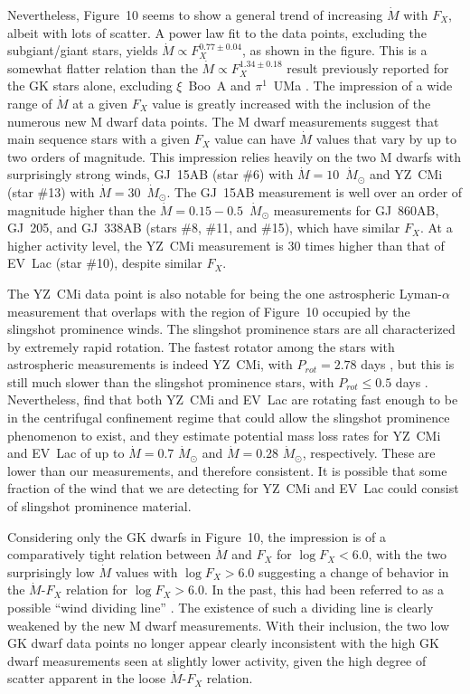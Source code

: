 \documentclass[preprint]{aastex}
\begin{document}
     Nevertheless, Figure~10 seems to show a general trend of increasing
$\dot{M}$ with $F_X$, albeit with lots of scatter.  A power law fit to the
data points, excluding the subgiant/giant stars, yields
$\dot{M}\propto F_X^{0.77\pm 0.04}$, as shown in the figure.  This
is a somewhat flatter relation than the $\dot{M}\propto F_X^{1.34\pm 0.18}$
result previously reported for the GK stars alone, excluding $\xi$~Boo~A and
$\pi^1$~UMa \citep{bew05a}.  The impression of
a wide range of $\dot{M}$ at a given $F_X$ value is greatly increased
with the inclusion of the numerous new M dwarf data points.
The M dwarf measurements suggest that main sequence stars with a
given $F_X$ value can have $\dot{M}$ values that vary by up to two
orders of magnitude.  This impression relies heavily on the two M
dwarfs with surprisingly strong winds, GJ~15AB (star \#6) with
$\dot{M}=10$~$\dot{M}_{\odot}$ and YZ~CMi (star \#13) with
$\dot{M}=30$~$\dot{M}_{\odot}$.  The GJ~15AB measurement is well over
an order of magnitude higher than the $\dot{M}=0.15-0.5$~$\dot{M}_{\odot}$ 
measurements for GJ~860AB, GJ~205, and GJ~338AB (stars \#8, \#11, and \#15),
which have similar $F_X$.  At a higher activity level, the YZ~CMi
measurement is 30 times higher than that of EV~Lac (star \#10),
despite similar $F_X$.

     The YZ~CMi data point is also notable for being the one astrospheric
Lyman-$\alpha$ measurement that overlaps with the region of Figure~10
occupied by the slingshot prominence winds.  The slingshot prominence
stars are all characterized by extremely rapid rotation.  The fastest
rotator among the stars with astrospheric measurements is indeed YZ~CMi, with
$P_{rot}=2.78$ days \citep{eda19}, but this is still much
slower than the slingshot prominence stars, with $P_{rot}\leq 0.5$ days
\citep{mj19}.  Nevertheless, \citet{cvd18}
find that both YZ~CMi and EV~Lac are
rotating fast enough to be in the centrifugal confinement regime that could
allow the slingshot prominence phenomenon to exist, and they estimate
potential mass loss rates for YZ~CMi and EV~Lac of up to
$\dot{M}=0.7$ $\dot{M}_{\odot}$ and $\dot{M}=0.28$ $\dot{M}_{\odot}$,
respectively.  These are lower than our measurements, and therefore
consistent.  It is possible that some fraction of the wind that
we are detecting for YZ~CMi and EV~Lac could consist of slingshot
prominence material.

     Considering only the GK dwarfs in Figure~10, the impression is of a
comparatively tight relation between $\dot{M}$ and $F_X$ for $\log F_X<6.0$,
with the two surprisingly low $\dot{M}$ values with $\log F_X>6.0$ suggesting
a change of behavior in the $\dot{M}$-$F_X$ relation for $\log F_X>6.0$.
In the past, this had been referred to as a possible ``wind dividing line''
\citep{bew05a,bew14}.  The existence of such a dividing line
is clearly weakened by the new M dwarf measurements.  With their inclusion,
the two low GK dwarf data points no longer appear clearly inconsistent
with the high GK dwarf measurements seen at slightly lower activity, given
the high degree of scatter apparent in the loose $\dot{M}$-$F_X$ relation.
\end{document}
